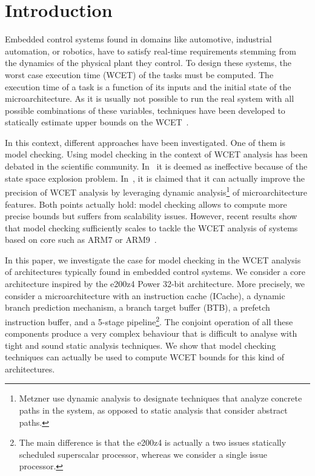 \section{Introduction}

Embedded control systems found in domains like automotive, industrial automation, or robotics, have to satisfy real-time requirements stemming from the dynamics of the physical plant they control.
To design these systems, the worst case execution time (WCET) of the tasks must be computed.
The execution time of a task is a function of its inputs and the initial state of the microarchitecture.
As it is usually not possible to run the real system with all possible combinations of these variables, techniques have been developed to statically estimate upper bounds on the WCET~\cite{Wilhelm2008}.

In this context, different approaches have been investigated. 
One of them is model checking.
Using model checking in the context of WCET analysis has been debated in the scientific community.
In~\cite{Wilhelm2004} it is deemed as ineffective because of the state space explosion problem.
In~\cite{Metzner2004}, it is claimed that it can actually improve the precision of WCET analysis by leveraging dynamic analysis\footnote{Metzner use dynamic analysis to designate techniques that analyze concrete paths in the system, as opposed to static analysis that consider abstract paths.} of microarchitecture features.
Both points actually hold: model checking allows to compute more precise bounds but suffers from scalability issues.
However, recent results show that model checking sufficiently scales to tackle the WCET analysis of systems based on core such as ARM7 or ARM9~\cite{Dalsgaard2010,Cassez2013}.

In this paper, we investigate the case for model checking in the WCET analysis of architectures
typically found in embedded control systems.
We consider a core architecture inspired by the e200z4 Power 32-bit architecture.
More precisely, we consider a microarchitecture with an instruction cache (ICache), a dynamic branch prediction mechanism, a branch target buffer (BTB), %
 a prefetch instruction buffer, and a 5-stage pipeline\footnote{The main difference is that the e200z4 is actually a two issues statically scheduled superscalar processor, whereas we consider a single issue processor.}.
The conjoint operation of all these components produce a very complex behaviour that is difficult to analyse with tight and sound static analysis techniques.
We show that model checking techniques can actually be used to compute WCET bounds for this kind of architectures.

